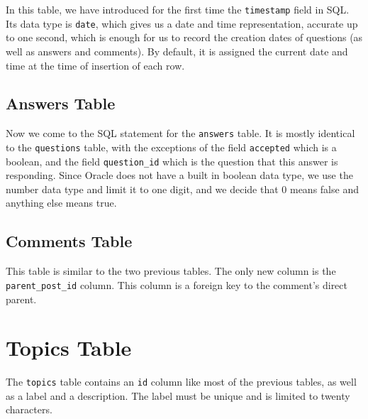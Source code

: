 In this table, we have introduced for the first time the \verb`timestamp` field in SQL. Its data type is \verb`date`, which gives us a date and time representation, accurate up to one second, which is enough for us to record the creation dates of questions (as well as answers and comments). By default, it is assigned the current date and time at the time of insertion of each row.


\subsection{Answers Table}

Now we come to the SQL statement for the \verb`answers` table. It is mostly identical to the \verb`questions` table, with the exceptions of the field \verb`accepted` which is a boolean, and the field \verb`question_id` which is the question that this answer is responding. Since Oracle does not have a built in boolean data type, we use the number data type and limit it to one digit, and we decide that 0 means false and anything else means true.


\subsection{Comments Table}

This table is similar to the two previous tables. The only new column is the \verb`parent_post_id` column. This column is a foreign key to the comment's direct parent.


\section{Topics Table}

The \verb`topics` table contains an \verb`id` column like most of the previous tables, as well as a label and a description. The label must be unique and is limited to twenty characters.

